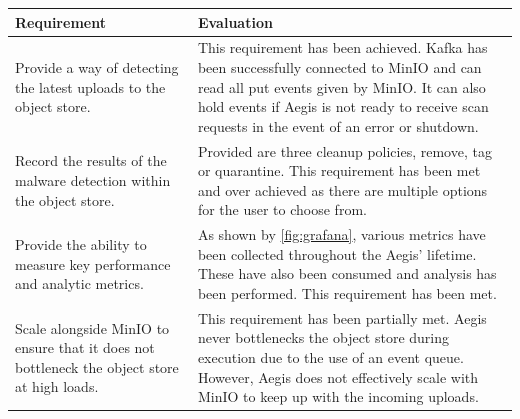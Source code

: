 \documentclass[12pt, conference, final, a4paper, onecolumn, compsoc]{IEEEtran}
\begin{document}
\begin{table}[H]
  \centering
  \begin{tabular}{|p{}|p{}|}
    \hline
    \textbf{Requirement} & \textbf{Evaluation} \\ \hline
    Provide a way of detecting the latest uploads to the object store. & This
                                                                        requirement
    has been achieved. Kafka has been successfully connected to MinIO and can
                                                                        read all
    put events given by MinIO. It can also hold events if Aegis is not ready to
                                                                        receive
                                                                        scan
                                                                        requests
    in the event of an error or shutdown. \\ \hline
    Record the results of the malware detection within the object store. &
                                                                          Provided
                                                                          are
                                                                          three
                                                                          cleanup
    policies, remove, tag or quarantine. This requirement has been met and over
                                                                          achieved
    as there are multiple options for the user to choose from. \\ \hline
    Provide the ability to measure key performance and analytic metrics. & As shown by
                                                     \ref{fig:grafana}, various
                                                     metrics have been collected
    throughout the Aegis' lifetime. These have also been consumed and
                                                     analysis has been
                                                     performed. This requirement
    has been met. \\ \hline
    Scale alongside MinIO to ensure that it does not bottleneck the object store
    at high loads. & This requirement has been partially met. Aegis never
                    bottlenecks the object store during execution due to the use
    of an event queue. However, Aegis does not effectively scale with MinIO to
                    keep up with the incoming uploads. \\ \hline

\end{tabular}
\end{table}
\end{document}
